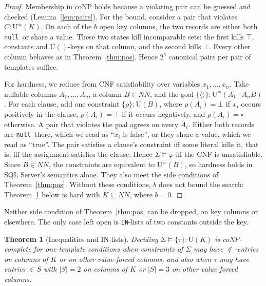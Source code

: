 \documentclass[conference]{IEEEtran}
\newtheorem{theorem}{Theorem}
\theoremstyle{definition}
\newcommand{\sql}[1]{\texttt{#1}}
\newcommand{\nul}{\texttt{null}}
\newcommand{\NN}{\mathit{NN}}
\newcommand{\Sig}{\Sigma}
\newcommand{\U}[1]{\mathrm{U}(#1)}
\newcommand{\Ueq}[1]{\mathrm{U}^{=}(#1)}
\newcommand{\any}{\square}
\newcommand{\tpl}[1]{\ensuremath{\langle #1\rangle}}
\begin{document}
\begin{proof}
Membership in coNP holds because a violating pair can be guessed and checked (Lemma~\ref{lem:pairs}). For the
bound, consider a pair that violates $C:\Ueq{K}$. On each of the $b$ open key columns, the two records are either both
\nul\ or share a value. These two states kill incomparable sets: the first kills $\top$, constants and $\U{}$-keys on
that column, and the second kills $\bot$. Every other column behaves as in Theorem~\ref{thm:pos}. Hence $2^b$ canonical
pairs per pair of templates suffice.

For hardness, we reduce from CNF satisfiability over variables $x_1,\dots,x_n$. Take nullable columns
$A_1,\dots,A_n$, a column $B\in\NN$, and the goal $\{\tpl{}\}:\Ueq{A_1\cdots A_nB}$. For each clause, add one constraint
$\{\rho\}:\U{B}$, where $\rho(A_i)=\bot$ if $x_i$ occurs positively in the clause, $\rho(A_i)=\top$ if it occurs
negatively, and $\rho(A_i)=\any$ otherwise. A pair that violates the goal agrees on every $A_i$. Either both records are
\nul\ there, which we read as ``$x_i$ is false'', or they share a value, which we read as ``true''. The pair satisfies a
clause's constraint iff some literal kills it, that is, iff the assignment satisfies the clause. Hence
$\Sig\models\varphi$ iff the CNF is unsatisfiable. Since $B\in\NN$, the constraints are equivalent to $\Ueq{B}$, so
hardness holds in SQL Server's semantics alone. They also meet the side conditions of Theorem~\ref{thm:pos}. Without
these conditions, $b$ does not bound the search: Theorem~\ref{thm:neq} below is hard with $K\subseteq\NN$, where $b=0$.
\end{proof}

Neither side condition of Theorem~\ref{thm:pos} can be dropped, on key columns or elsewhere. The only case left open
is \sql{IN}-lists of two constants outside the key.

\begin{theorem}[Inequalities and IN-lists]\label{thm:neq}
Deciding $\Sig\models\{\tau\}:\U{K}$ is coNP-complete for one-template conditions when
constraints of $\Sig$ may have ${\notin}$-entries on columns of $K$ or on other value-forced
columns, and also when $\tau$ may have entries ${\in}S$ with $|S|=2$ on columns of $K$ or
$|S|=3$ on other value-forced columns.
\end{theorem}
\end{document}
